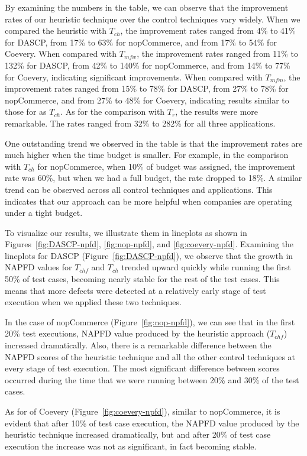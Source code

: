 By examining the numbers in the table, we can observe that the improvement
rates of our heuristic technique over the control techniques vary widely. 
When we compared the heuristic with $T_{ch}$, the improvement rates ranged from
4\% to 41\% for DASCP, from 17\% to 63\% for nopCommerce, and from 17\% to 54\%
for Coevery.
When compared with $T_{mfw}$, the improvement rates ranged from
11\% to 132\% for DASCP, from 42\% to 140\% for nopCommerce, and from 14\% to 77\%
for Coevery, indicating significant improvements. 
When compared with $T_{mfm}$, the improvement rates ranged from
15\% to 78\% for DASCP, from 27\% to 78\% for nopCommerce, and from 27\% to 48\%
for Coevery, indicating results similar to those for as $T_{ch}$.
As for the comparison with $T_{r}$, the results were more remarkable.
The rates ranged from 32\% to 282\% for all three applications. 

One outstanding trend we observed in the table is that the improvement 
rates are much higher when the time budget is smaller.
For example, in the comparison with $T_{ch}$ for nopCommerce, 
when 10\% of budget was assigned, the improvement rate was 60\%,
but when we had a full budget, the rate dropped to 18\%.
A similar trend can be observed across all control techniques and applications.  
This indicates that our approach can be more helpful when companies are operating
under a tight budget.

To visualize our results, we illustrate them in lineplots as shown in
Figures~\ref{fig:DASCP-npfd}, \ref{fig:nop-npfd}, and \ref{fig:coevery-npfd}. 
Examining the lineplots for DASCP (Figure~\ref{fig:DASCP-npfd}), we observe 
that the growth in NAPFD values for $T_{chf}$ and $T_{ch}$ trended upward quickly while 
running the first 50\% of test cases, becoming nearly stable for the rest 
of the test cases. This means that more defects were detected at a relatively
early stage of test execution when we applied these two techniques. 

In the case of nopCommerce (Figure~\ref{fig:nop-npfd}), we can see 
that in the first 20\% test executions, NAPFD value produced by the heuristic approach 
($T_{chf}$) increased dramatically.  
Also, there is a remarkable difference between the NAPFD scores of 
the heuristic technique and all the other control techniques at every stage of
test execution. The most significant difference between scores 
occurred during the time that we were running between 
20\% and 30\% of the test cases. 

As for of Coevery (Figure~\ref{fig:coevery-npfd}),
similar to nopCommerce, it is evident that after 10\% of test case execution, 
the NAPFD value produced by the heuristic technique increased dramatically, but 
and after 20\% of test case execution 
the increase was not as significant, in fact becoming stable.

